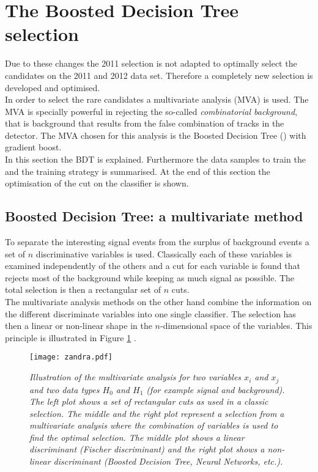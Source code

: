 \section{The Boosted Decision Tree selection}
Due to these changes the 2011 selection is not adapted to optimally select the \BdKstee candidates on the 2011 and 2012 data set. Therefore a completely new selection is developed and optimised.\\
In order to select the rare \BdKstee candidates a multivariate analysis (MVA) is used. The MVA is specially powerful in rejecting the so-called \textit{combinatorial background}, that is background that results from the false combination of tracks in the detector. The MVA chosen for this analysis is the Boosted Decision Tree (\bdtn) with gradient boost.\\
In this section the BDT is explained. Furthermore the data samples to train the \bdtn and the training strategy is summarised. At the end of this section the optimisation of the cut on the \bdtn classifier is shown.\\

\subsection{Boosted Decision Tree: a multivariate method}
\label{sec:bdt}
To separate the interesting signal events from the surplus of background events a set of $n$ discriminative variables is used. Classically each of these variables is examined independently of the others and a cut for each variable is found that rejects most of the background while keeping as much signal as possible. The total selection is then a rectangular set of $n$ cuts. \\
The multivariate analysis methods on the other hand combine the information on the different discriminate variables into one single classifier. The selection has then a linear or non-linear shape in the $n$-dimensional space of the variables. This principle is illustrated in Figure \ref{fig:zandra} \cite{zandri}.\\
\begin{figure}[ht]
\begin{center}
\vspace*{-0.5cm}
\texttt{[image: zandra.pdf]}
\end{center}
\caption{\textit{Illustration of the multivariate analysis for two variables $x_i$ and $x_j$ and two data types $H_0$ and $H_1$ (for example signal and background). The left plot shows a set of rectangular cuts as used in a classic selection. The middle and the right plot represent a selection from a multivariate analysis where the combination of variables is used to find the optimal selection. The middle plot shows a linear discriminant (Fischer discriminant) and the right plot shows a non-linear discriminant (Boosted Decision Tree, Neural Networks, etc.).}\cite{zandri}}
\label{fig:zandra}
\end{figure}

